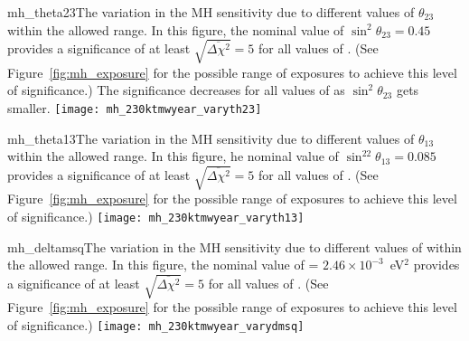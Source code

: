 \begin{cdrfigure}{mh_theta23}{The variation in the MH sensitivity due to different values of $\theta_{23}$ within the allowed range.  In this figure, the nominal value of $\sin^2\theta_{23} = 0.45$ provides a significance of at least $\sqrt{\overline{\Delta\chi^{2}}} = 5$ for all values of \deltacp. (See Figure~\ref{fig:mh_exposure} for the possible range of exposures to achieve this level of significance.) The significance decreases for all values of \deltacp as $\sin^2\theta_{23}$ gets smaller.}
 \texttt{[image: mh\_230ktmwyear\_varyth23]}
\end{cdrfigure}

\begin{cdrfigure}{mh_theta13}{The variation in the MH sensitivity due to different values of $\theta_{13}$ within the allowed range.  In this figure, he nominal value of $\sin^22\theta_{13} = 0.085$ provides a significance of at least $\sqrt{\overline{\Delta\chi^{2}}} = 5$ for all values of \deltacp.  (See Figure~\ref{fig:mh_exposure} for the possible range of exposures to achieve this level of significance.)}
 \texttt{[image: mh\_230ktmwyear\_varyth13]}
\end{cdrfigure}

\begin{cdrfigure}{mh_deltamsq}{The variation in the MH sensitivity due to different values of  within the allowed range.  In this figure, the nominal value of  = $2.46\times 10^{-3}$~eV$^2$ provides a significance of at least $\sqrt{\overline{\Delta\chi^{2}}} = 5$ for all values of \deltacp.  (See Figure~\ref{fig:mh_exposure} for the possible range of exposures to achieve this level of significance.)}
 \texttt{[image: mh\_230ktmwyear\_varydmsq]}
\end{cdrfigure}

